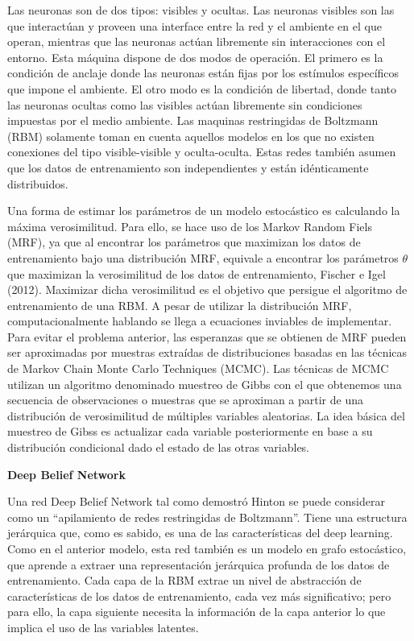\documentclass[
  a4paper,
  DIV=11,
  numbers=noendperiod]{scrreprt}
\begin{document}
Las neuronas son de dos tipos: visibles y ocultas. Las neuronas visibles
son las que interactúan y proveen una interface entre la red y el
ambiente en el que operan, mientras que las neuronas actúan libremente
sin interacciones con el entorno. Esta máquina dispone de dos modos de
operación. El primero es la condición de anclaje donde las neuronas
están fijas por los estímulos específicos que impone el ambiente. El
otro modo es la condición de libertad, donde tanto las neuronas ocultas
como las visibles actúan libremente sin condiciones impuestas por el
medio ambiente. Las maquinas restringidas de Boltzmann (RBM) solamente
toman en cuenta aquellos modelos en los que no existen conexiones del
tipo visible-visible y oculta-oculta. Estas redes también asumen que los
datos de entrenamiento son independientes y están idénticamente
distribuidos.

Una forma de estimar los parámetros de un modelo estocástico es
calculando la máxima verosimilitud. Para ello, se hace uso de los Markov
Random Fiels (MRF), ya que al encontrar los parámetros que maximizan los
datos de entrenamiento bajo una distribución MRF, equivale a encontrar
los parámetros \(\theta\) que maximizan la verosimilitud de los datos de
entrenamiento, Fischer e Igel (2012). Maximizar dicha verosimilitud es
el objetivo que persigue el algoritmo de entrenamiento de una RBM. A
pesar de utilizar la distribución MRF, computacionalmente hablando se
llega a ecuaciones inviables de implementar. Para evitar el problema
anterior, las esperanzas que se obtienen de MRF pueden ser aproximadas
por muestras extraídas de distribuciones basadas en las técnicas de
Markov Chain Monte Carlo Techniques (MCMC). Las técnicas de MCMC
utilizan un algoritmo denominado muestreo de Gibbs con el que obtenemos
una secuencia de observaciones o muestras que se aproximan a partir de
una distribución de verosimilitud de múltiples variables aleatorias. La
idea básica del muestreo de Gibss es actualizar cada variable
posteriormente en base a su distribución condicional dado el estado de
las otras variables.

\textbf{Deep Belief Network}

Una red Deep Belief Network tal como demostró Hinton se puede considerar
como un ``apilamiento de redes restringidas de Boltzmann''. Tiene una
estructura jerárquica que, como es sabido, es una de las características
del deep learning. Como en el anterior modelo, esta red también es un
modelo en grafo estocástico, que aprende a extraer una representación
jerárquica profunda de los datos de entrenamiento. Cada capa de la RBM
extrae un nivel de abstracción de características de los datos de
entrenamiento, cada vez más significativo; pero para ello, la capa
siguiente necesita la información de la capa anterior lo que implica el
uso de las variables latentes.
\end{document}
